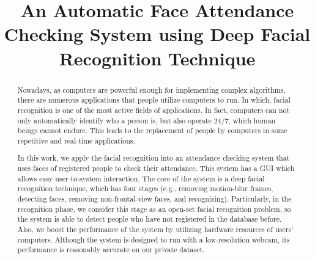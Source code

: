 \documentclass[journal, twocolumn]{IEEEtran}
\begin{document}
\title{An Automatic Face Attendance Checking System using Deep Facial Recognition Technique}


%


\maketitle


\begin{abstract}
Nowadays, as computers are powerful enough for implementing complex algorithms, there are numerous applications that people utilize computers to run. In which, facial recognition is one of the most active fields of applications. In fact, computers can not only automatically identify who a person is, but also operate 24/7, which human beings cannot endure. This leads to the replacement of people by computers in some repetitive and real-time applications.

In this work, we apply the facial recognition into an attendance checking system that uses faces of registered people to check their attendance. This system has a GUI which allows easy user-to-system interaction. The core of the system is a deep facial recognition technique, which has four stages (e.g., removing motion-blur frames, detecting faces, removing non-frontal-view faces, and recognizing). Particularly, in the recognition phase, we consider this stage as an open-set facial recognition problem, so the system is able to detect people who have not registered in the database before. Also, we boost the performance of the system by utilizing hardware resources of users' computers. Although the system is designed to run with a low-resolution webcam, its performance is reasonably accurate on our private dataset.
\end{abstract}
\end{document}
